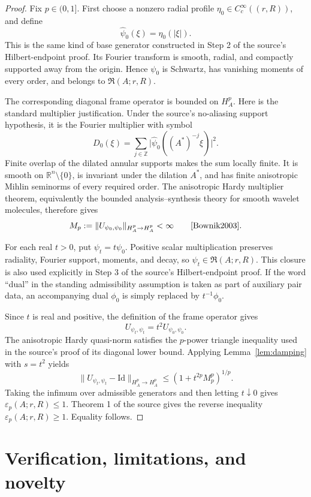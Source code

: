 \documentclass[11pt]{article}
\theoremstyle{remark}
\newcommand{\R}{\mathbb R}
\newcommand{\Id}{\mathrm{Id}}
\newcommand{\eps}{\varepsilon}
\begin{document}
\begin{proof}
Fix \(p\in(0,1]\). First choose a nonzero radial profile
\(\eta_0\in C_c^\infty((r,R))\), and define
\[
 \widehat\psi_0(\xi)=\eta_0(|\xi|).
\]
This is the same kind of base generator constructed in Step 2 of the source's
Hilbert-endpoint proof. Its Fourier transform is smooth, radial, and compactly
supported away from the origin. Hence \(\psi_0\) is Schwartz, has vanishing
moments of every order, and belongs to \(\mathfrak R(A;r,R)\).

The corresponding diagonal frame operator is bounded on \(H_A^p\). Here is
the standard multiplier justification. Under the source's no-aliasing support
hypothesis, it is the Fourier multiplier with symbol
\[
 D_0(\xi)=\sum_{j\in\mathbb Z}
 \bigl|\widehat\psi_0((A^*)^{-j}\xi)\bigr|^2.
\]
Finite overlap of the dilated annular supports makes the sum locally finite.
It is smooth on \(\R^n\setminus\{0\}\), is invariant under the dilation
\(A^*\), and has finite anisotropic Mihlin seminorms of every required order.
The anisotropic Hardy multiplier theorem, equivalently the bounded
analysis--synthesis theory for smooth wavelet molecules, therefore gives
\[
 M_p:=\|U_{\psi_0,\psi_0}\|_{H_A^p\to H_A^p}<\infty
 \qquad\text{\cite[Ch.~1, Sec.~9]{Bownik2003}.}
\]

For each real \(t>0\), put \(\psi_t=t\psi_0\). Positive scalar multiplication
preserves radiality, Fourier support, moments, and decay, so
\(\psi_t\in\mathfrak R(A;r,R)\). This closure is also used explicitly in
Step 3 of the source's Hilbert-endpoint proof. If the word ``dual'' in the
standing admissibility assumption is taken as part of auxiliary pair data,
an accompanying dual \(\phi_0\) is simply replaced by \(t^{-1}\phi_0\).

Since \(t\) is real and positive, the definition of the frame operator gives
\[
 U_{\psi_t,\psi_t}=t^2U_{\psi_0,\psi_0}.
\]
The anisotropic Hardy quasi-norm satisfies the \(p\)-power triangle inequality
used in the source's proof of its diagonal lower bound. Applying
Lemma~\ref{lem:damping} with \(s=t^2\) yields
\[
 \|U_{\psi_t,\psi_t}-\Id\|_{H_A^p\to H_A^p}
 \le (1+t^{2p}M_p^p)^{1/p}.
\]
Taking the infimum over admissible generators and then letting \(t\downarrow0\)
gives \(\eps_p(A;r,R)\le1\). Theorem 1 of the source gives the reverse
inequality \(\eps_p(A;r,R)\ge1\). Equality follows.
\end{proof}

\section{Verification, limitations, and novelty}
\end{document}
